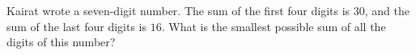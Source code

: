 Kairat wrote a seven-digit number. The sum of the first four digits is $30$, and the sum of the last four digits is $16$. What is the smallest possible sum of all the digits of this number?
